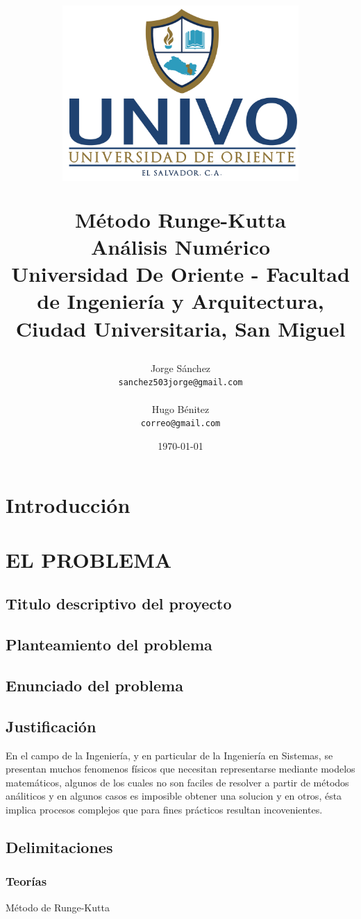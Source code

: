 \documentclass[12pt]{article}
\title{
\centerline{\includegraphics[width=90mm]{images/UNIVO.png}}
\vspace{0.5 cm}
Método Runge-Kutta
\large  \\
\vspace{1.0 cm}
Análisis Numérico\\ 
\small Universidad De Oriente - Facultad de Ingeniería y Arquitectura, Ciudad Universitaria, San Miguel 
  }
\author{
    Jorge Sánchez\\
    \texttt{sanchez503jorge@gmail.com}\\\\
    Hugo Bénitez\\
    \texttt{correo@gmail.com}
}
\date{\today}
\begin{document}
\maketitle
\begin{titlepage}
	\tableofcontents{}
\end{titlepage}

\section*{Introducción}
\newpage


\section{EL PROBLEMA}

\subsection{Titulo descriptivo del proyecto}

\subsection{Planteamiento del problema}

\subsection{Enunciado del problema}

\subsection{Justificación}
En el campo de la Ingeniería, y en particular de la Ingeniería en Sistemas, se presentan muchos fenomenos 
físicos que necesitan representarse mediante modelos matemáticos, algunos de los cuales 
no son faciles de resolver a partir de métodos análiticos y en algunos casos es imposible 
obtener una solucion y en otros, ésta implica procesos complejos que para fines prácticos resultan incovenientes.

\subsection{Delimitaciones}

\subsubsection{Teorías}
Método de Runge-Kutta
\end{document}

